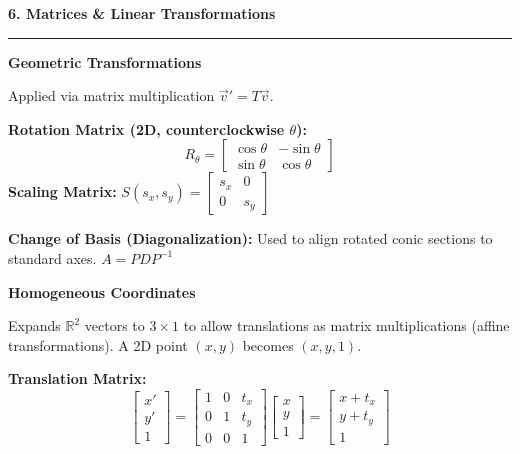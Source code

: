 \documentclass[10pt, landscape, twocolumn]{article}
\newcommand{\cheatsheetsection}[1]{
    \vspace{0.6em}
    {\color{themeblue}\large\bfseries #1} \par
    \vspace{-0.5em}
    {\color{themeblue}\rule{\linewidth}{1pt}} \par
    \vspace{0.2em}
}
\newcommand{\cheatsheetsubsection}[1]{
    \vspace{0.4em}
    {\color{themeblue}\normalsize\bfseries #1} \par
    \vspace{0.1em}
}
\begin{document}
\newpage
\cheatsheetsection{6. Matrices \& Linear Transformations}

\cheatsheetsubsection{Geometric Transformations}
Applied via matrix multiplication $\vec{v}' = T \vec{v}$.

\vspace{-0.5em}
\begin{center}
\end{center}
\vspace{-0.5em}

\textbf{Rotation Matrix (2D, counterclockwise $\theta$):}
\[ R_\theta = \begin{bmatrix} \cos\theta & -\sin\theta \\ \sin\theta & \cos\theta \end{bmatrix} \]
\textbf{Scaling Matrix:} $S(s_x, s_y) = \begin{bmatrix} s_x & 0 \\ 0 & s_y \end{bmatrix}$

\textbf{Change of Basis (Diagonalization):}
Used to align rotated conic sections to standard axes. $A = PDP^{-1}$

\cheatsheetsubsection{Homogeneous Coordinates}
Expands $\mathbb{R}^2$ vectors to $3 \times 1$ to allow translations as matrix multiplications (affine transformations). A 2D point $(x,y)$ becomes $(x, y, 1)$.

\textbf{Translation Matrix:}
\[ \begin{bmatrix} x' \\ y' \\ 1 \end{bmatrix} = \begin{bmatrix} 1 & 0 & t_x \\ 0 & 1 & t_y \\ 0 & 0 & 1 \end{bmatrix} \begin{bmatrix} x \\ y \\ 1 \end{bmatrix} = \begin{bmatrix} x + t_x \\ y + t_y \\ 1 \end{bmatrix} \]
\end{document}

